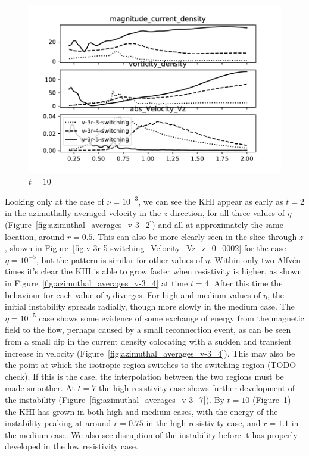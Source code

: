 \begin{figure}[h]
  \centering
  \includegraphics[width=0.8\linewidth]{./images/null_point_khi/azimuthal_averages_v-3_10.pdf}
  \caption{$t=10$}%
  \label{fig:azimuthal_averages_v-3_10}
\end{figure}

Looking only at the case of $\nu = 10^{-3}$, we can see the KHI appear as early as $t=2$ in the azimuthally averaged velocity in the $z$-direction, for all three values of $\eta$ (Figure~\ref{fig:azimuthal_averages_v-3_2}) and all at approximately the same location, around $r=0.5$. This can also be more clearly seen in the slice through $z$, shown in Figure~\ref{fig:v-3r-5-switching_Velocity_Vz_z_0_0002} for the case $\eta=10^{-5}$, but the pattern is similar for other values of $\eta$. Within only two Alfv\'en times it's clear the KHI is able to grow faster when resistivity is higher, as shown in Figure~\ref{fig:azimuthal_averages_v-3_4} at time $t=4$. After this time the behaviour for each value of $\eta$ diverges. For high and medium values of $\eta$, the initial instability spreads radially, though more slowly in the medium case. The $\eta=10^{-5}$ case shows some evidence of some exchange of energy from the magnetic field to the flow, perhaps caused by a small reconnection event, as can be seen from a small dip in the current density colocating with a sudden and transient increase in velocity (Figure~\ref{fig:azimuthal_averages_v-3_4}). This may also be the point at which the isotropic region switches to the switching region (TODO check). If this is the case, the interpolation between the two regions must be made smoother. At $t=7$ the high resistivity case shows further development of the instability (Figure~\ref{fig:azimuthal_averages_v-3_7}). By $t=10$ (Figure~\ref{fig:azimuthal_averages_v-3_10}) the KHI has grown in both high and medium cases, with the energy of the instability peaking at around $r=0.75$ in the high resistivity case, and $r=1.1$ in the medium case. We also see disruption of the instability before it has properly developed in the low resistivity case.


